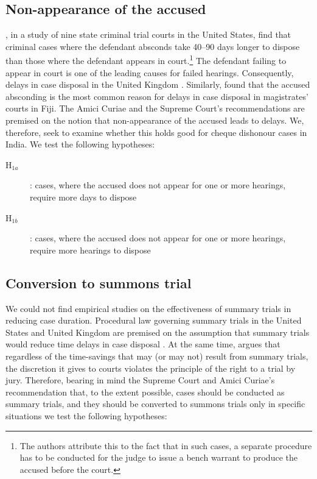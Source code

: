 \subsection{Non-appearance of the accused} 
\label{sec:non-appe-accus}

\textcite{ostrom2000efficiency}, in a study of nine state criminal trial courts in the United States, find that criminal cases where the defendant absconds take 40--90 days longer to dispose than those where the defendant appears in court.\footnote{The authors attribute this to the fact that in such cases, a separate procedure has to be conducted for the judge to issue a bench warrant to produce the accused before the court.} The defendant failing to appear in court is one of the leading causes for failed hearings. Consequently, delays in case disposal in the United Kingdom \autocite{crownProsecutionService2006_magistrateCourtEfficiency}. Similarly, \textcite{llangasinghe1988_fijiJudicialDelays} found that the accused absconding is the most common reason for delays in case disposal in magistrates' courts in Fiji. The Amici Curiae and the Supreme Court's recommendations are premised on the notion that non-appearance of the accused leads to delays. We, therefore, seek to examine whether this holds good for cheque dishonour cases in India. We test the following hypotheses:

\begin{description}
\item[H$_{1a}$]: cases, where the accused does not appear for one or more hearings, require more days to dispose
\item[H$_{1b}$]: cases, where the accused does not appear for one or more hearings, require more hearings to dispose
\end{description}

\subsection{Conversion to summons trial}
\label{sec:conv-summ-trial}

We could not find empirical studies on the effectiveness of summary trials in reducing case duration. Procedural law governing summary trials in the United States and United Kingdom are premised on the assumption that summary trials would reduce time delays in case disposal \autocite{miller2003}. At the same time, \textcite{miller2003} argues that regardless of the time-savings that may (or may not) result from summary trials, the discretion it gives to courts violates the principle of the right to a trial by jury. Therefore, bearing in mind the Supreme Court and Amici Curiae's recommendation that, to the extent possible, cases should be conducted as summary trials, and they should be converted to summons trials only in specific situations we test the following hypotheses:

